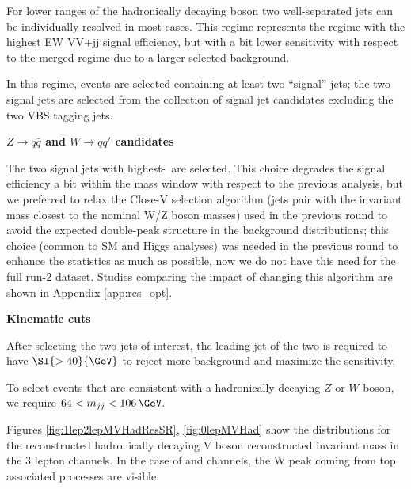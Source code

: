 For lower \pt ranges of the hadronically decaying boson two well-separated jets can be individually resolved in most cases. This regime represents the regime with the highest EW VV+jj signal efficiency, but with a bit lower sensitivity with respect to the merged regime due to a larger selected background.

In this regime, events are selected containing at least two ``signal'' jets;
the two signal jets are selected from the collection of signal jet candidates excluding the
two VBS tagging jets. 

\textbf{$Z \to q\bar{q}$ and $W \to qq'$ candidates}

The two signal jets with highest-\pt\ are selected. This choice degrades the signal efficiency a bit within the mass window with respect to the previous analysis, but we preferred to relax the Close-V selection algorithm (jets pair with the invariant mass closest to the nominal W/Z boson masses) used in the previous round to avoid the expected double-peak structure in the background distributions; this choice (common to SM and Higgs analyses) was needed in the previous round to enhance the statistics as much as possible, now we do not have this need for the full run-2 dataset. Studies comparing the impact of changing this algorithm are shown in Appendix \ref{app:res_opt}.

\textbf{Kinematic cuts}

After selecting the two jets of interest, the leading jet of the two is required to have \pt $\SI{>40}{\GeV}$
to reject more background and maximize the sensitivity.
 
To select events that are consistent with a hadronically decaying $Z$ or $W$ boson, we require $64 <m_{jj}<106\,\GeV$.

Figures \ref{fig:1lep2lepMVHadResSR}, \ref{fig:0lepMVHad} show the distributions 
for the reconstructed hadronically decaying V boson reconstructed invariant mass in the 3 lepton channels. 
In the case of \zlep and \olep channels, the W peak coming from top associated processes are visible.

